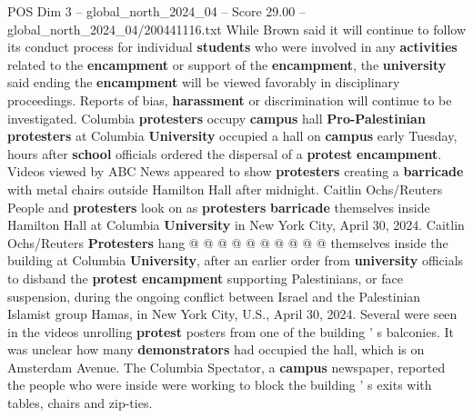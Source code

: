 \begin{textsample}{POS Dim 3 – global\_north\_2024\_04 – Score 29.00 – global\_north\_2024\_04/200441116.txt}
While Brown said it will continue to follow its conduct process for individual \textbf{students} who were involved in any \textbf{activities} related to the \textbf{encampment} or support of the \textbf{encampment}, the \textbf{university} said ending the \textbf{encampment} will be viewed favorably in disciplinary proceedings.
Reports of bias, \textbf{harassment} or discrimination will continue to be investigated.
Columbia \textbf{protesters} occupy \textbf{campus} hall \textbf{Pro-Palestinian} \textbf{protesters} at Columbia \textbf{University} occupied a hall on \textbf{campus} early Tuesday, hours after \textbf{school} officials ordered the dispersal of a \textbf{protest} \textbf{encampment}.
Videos viewed by ABC News appeared to show \textbf{protesters} creating a \textbf{barricade} with metal chairs outside Hamilton Hall after midnight.
Caitlin Ochs/Reuters People and \textbf{protesters} look on as \textbf{protesters} \textbf{barricade} themselves inside Hamilton Hall at Columbia \textbf{University} in New York City, April 30, 2024.
Caitlin Ochs/Reuters \textbf{Protesters} hang @ @ @ @ @ @ @ @ @ @ themselves inside the building at Columbia \textbf{University}, after an earlier order from \textbf{university} officials to disband the \textbf{protest} \textbf{encampment} supporting Palestinians, or face suspension, during the ongoing conflict between Israel and the Palestinian Islamist group Hamas, in New York City, U.S., April 30, 2024.
Several were seen in the videos unrolling \textbf{protest} posters from one of the building ' s balconies.
It was unclear how many \textbf{demonstrators} had occupied the hall, which is on Amsterdam Avenue.
The Columbia Spectator, a \textbf{campus} newspaper, reported the people who were inside were working to block the building ' s exits with tables, chairs and zip-ties.

\end{textsample}
